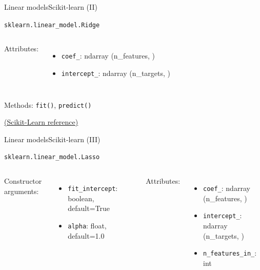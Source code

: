 \documentclass[10pt,compress]{beamer} %
\begin{document}
{\begin{frame}{Linear models}{Scikit-learn (II)}
\begin{exampleblock}{\texttt{sklearn.linear\_model.Ridge}}
\begin{columns}[T]
                Attributes:
                \begin{itemize}
                    \item \texttt{coef\_}:  ndarray (n\_features, )
                    \item \texttt{intercept\_}:  ndarray (n\_targets, )
                \end{itemize}
            \end{columns}

            \medskip

            Methods: \texttt{fit()}, \texttt{predict()}
        \end{exampleblock}

        \medskip
        \centering \href{https://scikit-learn.org/stable/modules/generated/sklearn.linear_model.Ridge.html}{(Scikit-Learn reference)}
    \end{frame}

    \begin{frame}{Linear models}{Scikit-learn (III)}
        \begin{exampleblock}{\texttt{sklearn.linear\_model.Lasso}}
         \medskip

         \begin{columns}[T]
                Constructor arguments:
                \begin{itemize}
                    \item \texttt{fit\_intercept}: boolean, default=True
                    \item \texttt{alpha}: float, default=1.0
                \end{itemize}

                Attributes:
                \begin{itemize}
                    \item \texttt{coef\_}:  ndarray (n\_features, )
                    \item \texttt{intercept\_}:  ndarray (n\_targets, )
                    \item \texttt{n\_features\_in\_}: int
                \end{itemize}
            \end{columns}

            \medskip


\end{exampleblock}
\end{frame}}
\end{document}
